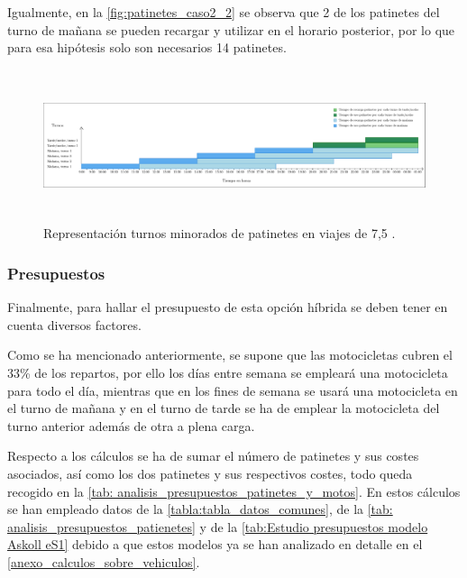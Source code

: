 Igualmente, en la \autoref{fig:patinetes_caso2_2} se observa que 2 de los patinetes del turno de mañana se pueden recargar y utilizar en el horario posterior, por lo que para esa hipótesis solo son necesarios 14 patinetes.

\begin{figure}[H]
    \centering
    \includegraphics[width= \textwidth, height=12em]{archivos/caso1_patinetes.pdf}
    \caption{Representación turnos minorados de patinetes en viajes de 7,5 .}
    \label{fig:patinetes_caso2_2}
\end{figure}

\subsubsection{Presupuestos}
Finalmente, para hallar el presupuesto de esta opción híbrida se deben tener en cuenta diversos factores. 

Como se ha mencionado anteriormente, se supone  que las motocicletas cubren el 33\% de los repartos, por ello los días entre semana se empleará una motocicleta para todo el día, mientras que en los fines de semana se usará una motocicleta en el turno de mañana y en el turno de tarde se ha de emplear la motocicleta del turno anterior además de otra a plena carga.

Respecto a los cálculos se ha de sumar el número de patinetes y sus costes asociados, así como los dos patinetes y sus respectivos costes, todo queda recogido en la \autoref{tab: analisis_presupuestos_patinetes_y_motos}. En estos cálculos se han empleado datos de la \autoref{tabla:tabla_datos_comunes}, de la \autoref{tab: analisis_presupuestos_patienetes} y de la \autoref{tab:Estudio presupuestos modelo Askoll eS1} debido a que estos modelos ya se han analizado en detalle en el \autoref{anexo_calculos_sobre_vehiculos}.

